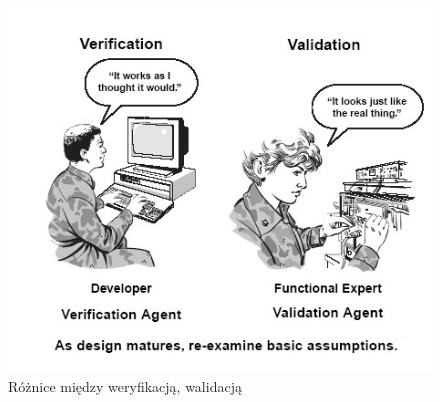 \documentclass[brudnopis]{xmgr}
\begin{document}
\begin{figure}[th!]
\centering
\includegraphics[width=.7\hsize]{images/Verification_Validation_Accreditation}
\caption{Różnice między weryfikacją, walidacją\label{RYS.1}}
\end{figure}
\end{document}
